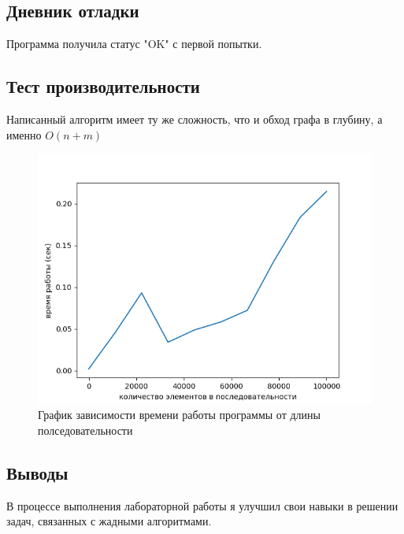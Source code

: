 \documentclass[12pt]{article}
\begin{document}
\subsection*{Дневник отладки}

Программа получила статус "OK" с первой попытки.

\newpage
\subsection*{Тест производительности}

Написанный алгоритм имеет ту же сложность, что и обход графа в глубину, а именно $O(n + m)$
\begin{figure}
    \centering
    \includegraphics[width=\textwidth]{graph.png}
    \caption{График зависимости времени работы программы от длины полседовательности}
\end{figure}

\subsection*{Выводы}

В процессе выполнения лабораторной работы я улучшил свои навыки в решении задач, связанных с жадными алгоритмами.
\end{document}
